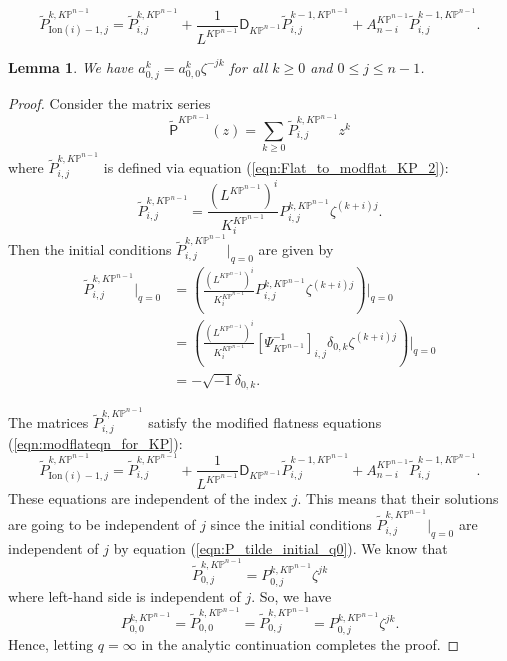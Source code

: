 \documentclass[10pt,a4paper]{amsart}
\newtheorem{lem}{Lemma}
\newcommand{\KP}{K\mathbb{P}}
\begin{document}
\begin{equation}\label{eqn:modflateqn_for_KP}
\widetilde{P}_{\mathrm{Ion}(i)-1,j}^{k,\KP^{n-1}}=\widetilde{P}_{i,j}^{k,\KP^{n-1}}+\frac{1}{L^{\KP^{n-1}}}\mathsf{D}_{\KP^{n-1}}\widetilde{P}_{i,j}^{k-1,\KP^{n-1}}+A^{\KP^{n-1}}_{n-i}\widetilde{P}_{i,j}^{k-1,\KP^{n-1}}.
\end{equation}

\begin{lem}
We have $a_{0,j}^k=a_{0,0}^k\zeta^{-jk}$ for all $k\geq{0}$ and $0\leq{j}\leq{n-1}$.
\end{lem}

\begin{proof}
Consider the matrix series 
\begin{equation*}
\widetilde{\mathsf{P}}^{\KP^{n-1}}(z)=\sum_{k\geq{0}}\widetilde{P}_{i,j}^{k,\KP^{n-1}}z^k
\end{equation*}
where $\widetilde{P}_{i,j}^{k,\KP^{n-1}}$ is defined via equation (\ref{eqn:Flat_to_modflat_KP_2}):
\begin{equation*}
\widetilde{P}_{i,j}^{k,\KP^{n-1}}=\frac{(L^{\KP^{n-1}})^i}{K^{\KP^{n-1}}_i}P_{i,j}^{k,\KP^{n-1}}\zeta^{(k+i)j}.
\end{equation*}
Then the initial conditions $\widetilde{P}_{i,j}^{k,\KP^{n-1}}\big\vert_{q=0}$ are given by
\begin{equation}\label{eqn:P_tilde_initial_q0}
\begin{split}
\widetilde{P}_{i,j}^{k,\KP^{n-1}}\big\vert_{q=0}
&=\left(\frac{(L^{\KP^{n-1}})^i}{K^{\KP^{n-1}}_i}P_{i,j}^{k,\KP^{n-1}}\zeta^{(k+i)j}\right)\Bigg\vert_{q=0}\\
&=\left(\frac{(L^{\KP^{n-1}})^i}{K^{\KP^{n-1}}_i}\left[\Psi^{-1}_{\KP^{n-1}}\right]_{i,j}\delta_{0,k}\zeta^{(k+i)j}\right)\Bigg\vert_{q=0}\\
&=-\sqrt{-1}\delta_{0,k}.
\end{split}
\end{equation}

The matrices $\widetilde{P}_{i,j}^{k,\KP^{n-1}}$ satisfy the modified flatness equations (\ref{eqn:modflateqn_for_KP}):
    \begin{equation*}
    \widetilde{P}_{\mathrm{Ion}(i)-1,j}^{k,\KP^{n-1}}=\widetilde{P}_{i,j}^{k,\KP^{n-1}}+\frac{1}{L^{\KP^{n-1}}}\mathsf{D}_{\KP^{n-1}}\widetilde{P}_{i,j}^{k-1,\KP^{n-1}}+A^{\KP^{n-1}}_{n-i}\widetilde{P}_{i,j}^{k-1,\KP^{n-1}}.
    \end{equation*}
These equations are independent of the index $j$. This means that their solutions are going to be independent of $j$ since the initial conditions $\widetilde{P}_{i,j}^{k,\KP^{n-1}}\big\vert_{q=0}$ are independent of $j$ by equation (\ref{eqn:P_tilde_initial_q0}). We know that
\begin{equation*}
\widetilde{P}_{0,j}^{k,\KP^{n-1}}=P_{0,j}^{k,\KP^{n-1}}\zeta^{jk}
\end{equation*}
where left-hand side is independent of $j$. So, we have
\begin{equation*}
P_{0,0}^{k,\KP^{n-1}}=\widetilde{P}_{0,0}^{k,\KP^{n-1}}=\widetilde{P}_{0,j}^{k,\KP^{n-1}}=P_{0,j}^{k,\KP^{n-1}}\zeta^{jk}.
\end{equation*}
Hence, letting $q=\infty$ in the analytic continuation completes the proof.
\end{proof}
\end{document}
